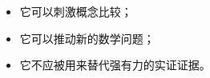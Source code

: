 \begin{itemize}[nosep]
  \item 它可以刺激概念比较；
  \item 它可以推动新的数学问题；
  \item 它不应被用来替代强有力的实证证据。
\end{itemize}